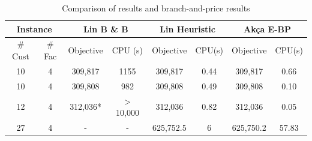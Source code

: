 \begin{table}[h!tbp]
  \begin{center}
  \caption{Comparison of \citet{Lin} results and branch-and-price results} \label{CompLin}
  \begin {tabular}[h]{|c|c|c|c|c|c|c|c|} \hline
\multicolumn{2}{|c}{Instance} & \multicolumn{2}{|c}{Lin B \& B} & \multicolumn{2}{|c}{Lin Heuristic} & \multicolumn{2}{|c|}{Ak\c{c}a E-BP} \\ \hline
\# Cust & \# Fac & Objective & CPU (s) & Objective & CPU(s) & Objective & CPU(s) \\ \hline
10 & 4 & 309,817   &    1155    &  309,817  &   0.44    & 309,817   &  0.66\\
10 & 4 & 309,808   &    982 & 309,808   &   0.49    & 309,808       & 0.10  \\
12 & 4 & 312,036*  & $>$ 10,000 &  312,036  &   0.82    & 312,036       & 0.05\\
27 & 4 & -         &      -     & 625,752.5 &     6     & 625,750.2 & 57.83 \\\hline
\end{tabular}
\end{center}
\end{table}


